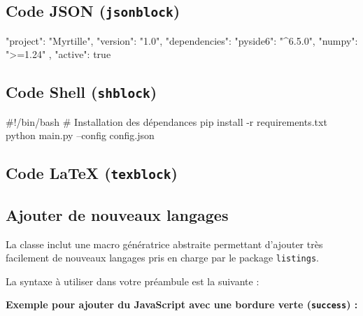 \subsection{Code JSON (\texttt{jsonblock})}
\begin{jsonblock}
{
  "project": "Myrtille",
  "version": "1.0",
  "dependencies": {
    "pyside6": "^6.5.0",
    "numpy": ">=1.24"
  },
  "active": true
}
\end{jsonblock}

\subsection{Code Shell (\texttt{shblock})}
\begin{shblock}
#!/bin/bash
# Installation des dépendances
pip install -r requirements.txt
python main.py --config config.json
\end{shblock}

\subsection{Code LaTeX (\texttt{texblock})}

\subsection{Ajouter de nouveaux langages}
La classe inclut une macro génératrice abstraite permettant d'ajouter très facilement de nouveaux langages pris en charge par le package \texttt{listings}. 

La syntaxe à utiliser dans votre préambule est la suivante :
\begin{texblock}
\end{texblock}

\textbf{Exemple pour ajouter du JavaScript avec une bordure verte (\texttt{success}) :}
\begin{texblock}
\end{texblock}

